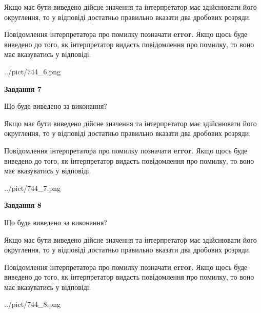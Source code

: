 \documentclass[12pt, ukrainian]{article}
\begin{document}
{\begin {Large}
Якщо має бути виведено дійсне значення та інтерпретатор має здійснювати його округлення, 
то у відповіді достатньо правильно вказати два дробових розряди.

Повідомлення інтерпретатора про помилку позначати \textbf{error}.
Якщо щось буде виведено до того, як інтерпретатор видасть повідомлення про помилку, 
то воно має вказуватись у відповіді. \par

\begin{center}
	{../pict/744_6.png}
\end{center}
\newpage

{\begin {center}\textbf{Завдання 7}\end {center}}\par
Що буде виведено за виконання? \par

Якщо має бути виведено дійсне значення та інтерпретатор має здійснювати його округлення, 
то у відповіді достатньо правильно вказати два дробових розряди.

Повідомлення інтерпретатора про помилку позначати \textbf{error}.
Якщо щось буде виведено до того, як інтерпретатор видасть повідомлення про помилку, 
то воно має вказуватись у відповіді. \par

\begin{center}
	{../pict/744_7.png}
\end{center}
\newpage

{\begin {center}\textbf{Завдання 8}\end {center}}\par
Що буде виведено за виконання? \par

Якщо має бути виведено дійсне значення та інтерпретатор має здійснювати його округлення, 
то у відповіді достатньо правильно вказати два дробових розряди.

Повідомлення інтерпретатора про помилку позначати \textbf{error}.
Якщо щось буде виведено до того, як інтерпретатор видасть повідомлення про помилку, 
то воно має вказуватись у відповіді. \par

\begin{center}
	{../pict/744_8.png}
\end{center}
\newpage


\end{Large}}
\end{document}
